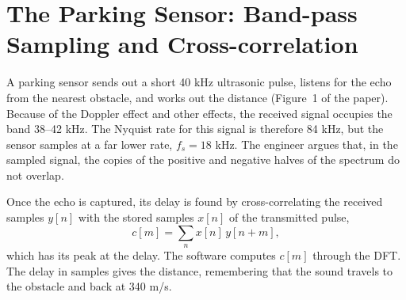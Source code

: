 \renewcommand{\teacherTag}{QUESTION 2 \textbullet\ 35 MARKS}
\chapter{The Parking Sensor: Band-pass Sampling and Cross-correlation}

\begin{scenario}
A parking sensor sends out a short 40 kHz ultrasonic pulse, listens for the echo from the nearest obstacle, and works out the distance (Figure~1 of the paper). Because of the Doppler effect and other effects, the received signal occupies the band 38--42 kHz. The Nyquist rate for this signal is therefore 84 kHz, but the sensor samples at a far lower rate, $f_s=18$ kHz. The engineer argues that, in the sampled signal, the copies of the positive and negative halves of the spectrum do not overlap.

Once the echo is captured, its delay is found by cross-correlating the received samples $y[n]$ with the stored samples $x[n]$ of the transmitted pulse,
\[c[m]=\sum_nx[n]\,y[n+m],\]
which has its peak at the delay. The software computes $c[m]$ through the DFT. The delay in samples gives the distance, remembering that the sound travels to the obstacle and back at 340 m/s.
\end{scenario}

\begin{center}
\end{center}

